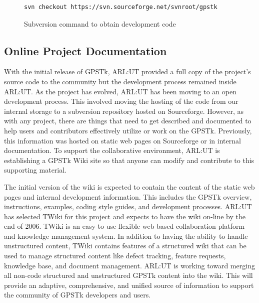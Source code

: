 \documentclass{ion-gps}
\begin{document}
\begin{figure}[htbp]
   \begin{scriptsize}
   \begin{bf}
   \begin{lstlisting}
svn checkout https://svn.sourceforge.net/svnroot/gpstk
   \end{lstlisting}
   \end{bf}
   \end{scriptsize}
  \caption{Subversion command to obtain development code}
  \label{fig:subversion}
\end{figure}

\subsection*{Online Project Documentation}

With the initial release of GPSTk, ARL:UT provided a full copy of the
project's source code to the community but the development
process remained inside ARL:UT.  As the project has evolved, ARL:UT
has been moving to an open development process.  This involved
moving the hosting of the code from our internal storage to a
subversion repository hosted on Sourceforge.  However, as with any
project, there are things that need to get described and documented to
help users and contributors effectively utilize or work on the GPSTk.
Previously, this information was hosted on static web pages on
Sourceforge or in internal documentation.  To support the
collaborative environment, ARL:UT is establishing a GPSTk Wiki site so
that anyone can modify and contribute to this supporting material.


The initial version of the wiki is expected to contain the content of
the static web pages and internal development information.  This
includes the GPSTk overview, instructions, examples, coding style
guides, and development processes.  ARL:UT has selected TWiki
\cite{twiki} for this project and expects to have the wiki on-line by
the end of 2006.  TWiki is an easy to use flexible web based
collaboration platform and knowledge management system.  In addition
to having the ability to handle unstructured content, TWiki contains
features of a structured wiki that can be used to manage structured
content like defect tracking, feature requests, knowledge base, and
document management.  ARL:UT is working toward merging all non-code
structured and unstructured GPSTk content into the wiki. This will
provide an adaptive, comprehensive, and unified source of information
to support the community of GPSTk developers and users.
\end{document}
